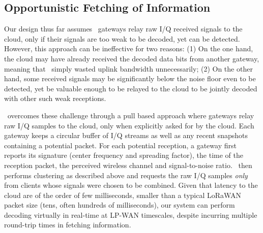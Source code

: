 
\subsection{Opportunistic Fetching of Information}
Our design thus far assumes \name\ gateways relay raw I/Q received signals to the cloud, only if their signals are too weak to be decoded, yet can be detected. However, this approach can be ineffective for two reasons: (1) On the one hand, the cloud may have already received the decoded data bits from another gateway, meaning that \name\ simply wasted uplink bandwidth unnecessarily; (2) On the other hand, some received signals may be significantly below the noise floor even to be detected, yet be valuable enough to be relayed to the cloud to be jointly decoded with other such weak receptions.  \vspace*{0.1in}

 \name\ overcomes these challenge through a pull based approach where gateways relay raw I/Q samples to the cloud, only when explicitly asked for by the cloud. Each gateway keeps a circular buffer of I/Q streams as well as any recent snapshots containing a potential packet. For each potential reception, a gateway first reports its signature (center frequency and spreading factor), the time of the reception packet, the perceived wireless channel and signal-to-noise ratio. \name\ then performs clustering as described above and requests the raw I/Q samples {\it only } from clients whose signals were chosen to be combined. Given that latency to the cloud are of the order of few milliseconds, smaller than a typical LoRaWAN packet size (tens, often hundreds of milliseconds), our system can perform decoding virtually in real-time at LP-WAN timescales, despite incurring multiple round-trip times in fetching information.\vspace*{0.1in}

